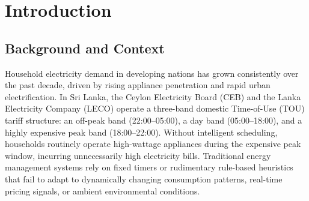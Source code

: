 \documentclass[12pt, a4paper]{article}
\begin{document}
\begin{abstract}
\noindent \textbf{Purpose:} Rising household electricity costs and inefficient appliance usage present a growing challenge for domestic energy management. This thesis presents an AI-based energy utilization system that combines Long Short-Term Memory (LSTM) neural network forecasting with an edge-deployed AI optimization agent to intelligently predict and optimize household appliance schedules. 
\textbf{Methodology:} The LSTM model forecasts 24-hour power consumption patterns for five typical appliances (washing machine, heater, air conditioner, vehicle charger, and vacuum cleaner) using historical minute-level telemetry. The predicted states are passed to an optimization agent that retrieves live Time-of-Use (TOU) electricity tariffs via MQTT, real-time weather data from the Open-Meteo API, and user preferences stored in Firebase Firestore. A locally-hosted Large Language Model (Llama 3.2 via Ollama) alongside Mixed-Integer Linear Programming (MILP) optimization generates schedules. These schedules are further corrected by deterministic post-processing rules to enforce hard constraints on peak-hour usage while preserving total appliance runtime.
\textbf{Results:} Experimental results on simulated Sri Lankan domestic tariff data demonstrate average per-cycle cost reductions exceeding 40\%, achieved without compromising user-specified appliance runtime requirements. 
\textbf{Conclusion:} The fully edge-native architecture ensures low latency, user privacy, and offline operational capability, making the system highly practical for deployment on resource-constrained smart home hardware.
\end{abstract}

\vspace{1cm}

\tableofcontents

\vspace{1cm}

\section{Introduction}

\subsection{Background and Context}
Household electricity demand in developing nations has grown consistently over the past decade, driven by rising appliance penetration and rapid urban electrification. In Sri Lanka, the Ceylon Electricity Board (CEB) and the Lanka Electricity Company (LECO) operate a three-band domestic Time-of-Use (TOU) tariff structure: an off-peak band (22:00--05:00), a day band (05:00--18:00), and a highly expensive peak band (18:00--22:00). Without intelligent scheduling, households routinely operate high-wattage appliances during the expensive peak window, incurring unnecessarily high electricity bills. Traditional energy management systems rely on fixed timers or rudimentary rule-based heuristics that fail to adapt to dynamically changing consumption patterns, real-time pricing signals, or ambient environmental conditions.
\end{document}
